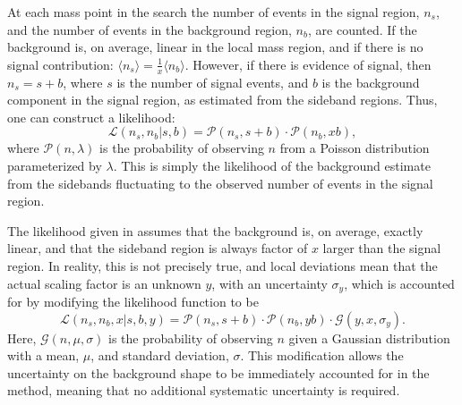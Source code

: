 At each mass point in the search the number of events in the signal region, $n_s$, and the number
of events in the background region, $n_b$, are counted.
If the background is, on average, linear in the local mass region, and if there is no signal
contribution: $\langle n_s\rangle=\tfrac1x\langle n_b\rangle$.
However, if there is evidence of signal, then $n_s=s+b$, where $s$ is the
number of signal events, and $b$ is the background component in the signal region, as
estimated from the sideband regions.
Thus, one can construct a likelihood:
\begin{equation}
  \mathcal{L}(n_s, n_b | s, b) =
  \mathcal{P}(n_s, s+b) \cdot
  \mathcal{P}(n_b, xb),
  \label{eq:db:like1}
\end{equation}
where $\mathcal{P}(n, \lambda)$ is the probability of observing $n$ from a Poisson distribution
parameterized by $\lambda$.
This is simply the likelihood of the background estimate from the sidebands fluctuating to
the observed number of events in the signal region.

The likelihood given in  assumes that the background is, on average, exactly
linear, and that the sideband region is always factor of $x$ larger than the
signal region.
In reality, this is not precisely true, and local deviations mean that the actual scaling factor is
an unknown $y$, with an uncertainty $\sigma_y$, which is accounted for by
modifying the likelihood function to be
\begin{equation}
  \mathcal{L}(n_s, n_b, x | s, b, y) =
  \mathcal{P}(n_s, s+b) \cdot
  \mathcal{P}(n_b, yb) \cdot
  \mathcal{G}(y,x,\sigma_y).
  \label{eq:db:like2}
\end{equation}
Here, $\mathcal{G}(n, \mu, \sigma)$ is the probability of observing $n$ given a Gaussian
distribution with a mean, $\mu$, and standard deviation, $\sigma$.
This modification allows the uncertainty on the background shape to be immediately accounted for in
the method, meaning that no additional systematic uncertainty is required.

